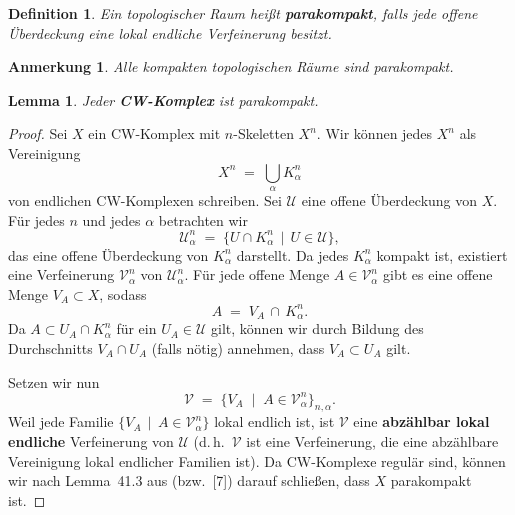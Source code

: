 \documentclass[12pt]{article}
\numberwithin{conj}{section}
\newtheorem{definition}[conj]{Definition}
\newtheorem{remark}[conj]{Anmerkung}
\newtheorem{lemma}[conj]{Lemma}
\begin{document}
    \begin{definition}
        Ein topologischer Raum heißt \textbf{parakompakt}, falls jede offene Überdeckung
        eine lokal endliche Verfeinerung besitzt.
    \end{definition}

    \begin{remark}
        Alle kompakten topologischen Räume sind parakompakt.
    \end{remark}

    \begin{lemma}
        Jeder \textbf{CW-Komplex} ist parakompakt.
    \end{lemma}

    \begin{proof}
        Sei $X$ ein CW-Komplex mit $n$-Skeletten $X^{n}$. Wir können jedes $X^{n}$
        als Vereinigung
        \[
            X^{n} \;=\; \bigcup_{\alpha}K^{n}_{\alpha}
        \]
        von endlichen CW-Komplexen schreiben. Sei $\mathcal{U}$ eine offene Überdeckung
        von $X$. Für jedes $n$ und jedes $\alpha$ betrachten wir
        \[
            \mathcal{U}^{n}_{\alpha} \;=\; \{U \cap K^{n}_{\alpha}\,\mid\, U \in \mathcal{U}
            \},
        \]
        das eine offene Überdeckung von $K^{n}_{\alpha}$ darstellt. Da jedes $K^{n}_{\alpha}$
        kompakt ist, existiert eine Verfeinerung $\mathcal{V}^{n}_{\alpha}$ von
        $\mathcal{U}^{n}_{\alpha}$. Für jede offene Menge $A \in \mathcal{V}^{n}_{\alpha}$
        gibt es eine offene Menge $V_{A} \subset X$, sodass
        \[
            A \;=\; V_{A} \,\cap\, K^{n}_{\alpha}.
        \]
        Da $A \subset U_{A} \cap K^{n}_{\alpha}$ für ein $U_{A} \in \mathcal{U}$
        gilt, können wir durch Bildung des Durchschnitts $V_{A} \cap U_{A}$ (falls
        nötig) annehmen, dass $V_{A} \subset U_{A}$ gilt.

        Setzen wir nun
        \[
            \mathcal{V}\;=\; \bigl\{V_{A} \;\mid\; A \in \mathcal{V}^{n}_{\alpha}\bigr
            \}_{n,\alpha}.
        \]
        Weil jede Familie $\{V_{A} \,\mid\, A \in \mathcal{V}^{n}_{\alpha}\}$
        lokal endlich ist, ist $\mathcal{V}$ eine \textbf{abzählbar lokal endliche}
        Verfeinerung von $\mathcal{U}$ (d.\,h.\ $\mathcal{V}$ ist eine Verfeinerung,
        die eine abzählbare Vereinigung lokal endlicher Familien ist). Da CW-Komplexe
        regulär sind, können wir nach Lemma~41.3 aus \cite{hatcher2001} (bzw.\ [7])
        darauf schließen, dass $X$ parakompakt ist.
    \end{proof}
\end{document}
